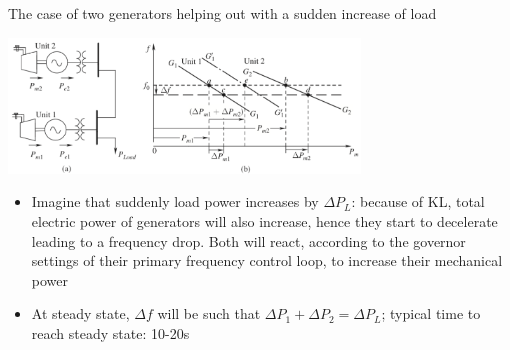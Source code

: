 \begin{frame}[allowframebreaks]{The case of two generators helping out with a sudden increase of load}
    \begin{center}
        \includegraphics[width=0.7\textwidth]{images/two-gen-primary.png}
    \end{center}
    \begin{itemize}
        \item Imagine that suddenly load power increases by $\Delta P_L$: because of KL, total electric power of generators will also increase, hence they start to decelerate leading to a frequency drop. Both will react, according to the governor settings of their primary frequency control loop, to increase their mechanical power
        \item At steady state, $\Delta f$ will be such that $\Delta P_1+ \Delta P_2 = \Delta P_L$; typical time to reach steady state: 10-20s
    \end{itemize}
\end{frame}

